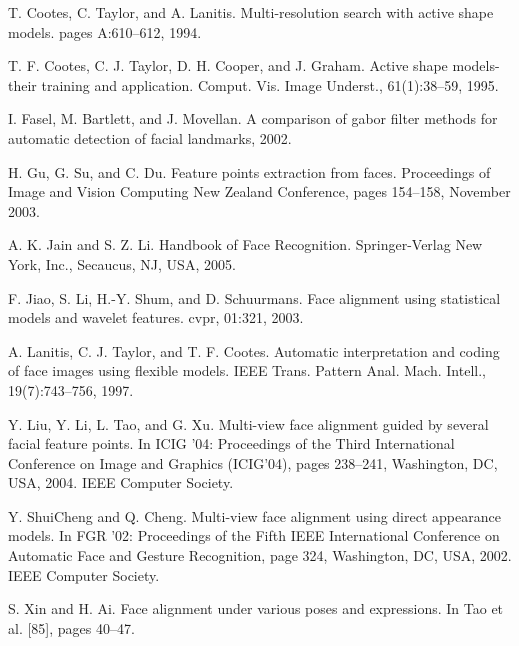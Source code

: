 \documentclass[12pt]{report}
\begin{document}
\begin{thebibliography}{9}
	T. Cootes, C. Taylor, and A. Lanitis. Multi-resolution search with active shape models. pages A:610–612, 1994. 
	
	T. F. Cootes, C. J. Taylor, D. H. Cooper, and J. Graham. Active shape models-their training and application. Comput. Vis. Image Underst., 61(1):38–59, 1995.
	
	I. Fasel, M. Bartlett, and J. Movellan. A comparison of gabor filter methods for automatic detection of facial landmarks, 2002. 
	 
	H. Gu, G. Su, and C. Du. Feature points extraction from faces. Proceedings of Image and Vision Computing New Zealand Conference, pages 154–158, November 2003. 
	
	A. K. Jain and S. Z. Li. Handbook of Face Recognition. Springer-Verlag New York, Inc., Secaucus, NJ, USA, 2005. 
	
	F. Jiao, S. Li, H.-Y. Shum, and D. Schuurmans. Face alignment using statistical models and wavelet features. cvpr, 01:321, 2003.
	
	A. Lanitis, C. J. Taylor, and T. F. Cootes. Automatic interpretation and coding of face images using flexible models. IEEE Trans. Pattern Anal. Mach. Intell., 19(7):743–756, 1997. 
	
	Y. Liu, Y. Li, L. Tao, and G. Xu. Multi-view face alignment guided by several facial feature points. In ICIG ’04: Proceedings of the Third International Conference on Image and Graphics (ICIG’04), pages 238–241, Washington, DC, USA, 2004. IEEE Computer Society. 
		
	Y. ShuiCheng and Q. Cheng. Multi-view face alignment using direct appearance models. In FGR ’02: Proceedings of the Fifth IEEE International Conference on Automatic Face and Gesture Recognition, page 324, Washington, DC, USA, 2002. IEEE Computer Society. 
		
	S. Xin and H. Ai. Face alignment under various poses and expressions. In Tao et al. [85], pages 40–47. 
\end{thebibliography}
\end{document}
